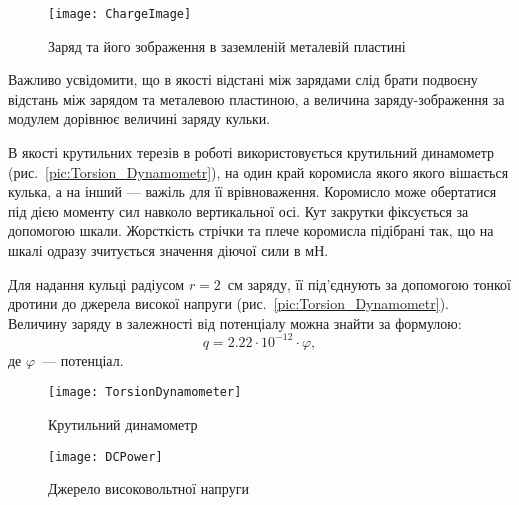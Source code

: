 \begin{wrapfigure}{O}{0.4\linewidth}\centering
		\texttt{[image: ChargeImage]}
		\caption{Заряд та його зображення в заземленій металевій пластині}
		\label{pic:Charge_Image}
\end{wrapfigure}
Важливо усвідомити, що в якості відстані між зарядами слід брати подвоєну відстань між зарядом та металевою пластиною, а величина заряду-зображення за модулем дорівнює величині заряду кульки.

В якості крутильних терезів в роботі використовується крутильний динамометр (рис.~\ref{pic:Torsion_Dynamometr}), на один край коромисла якого якого вішається кулька, а на інший --- важіль для її врівноваження. Коромисло може обертатися під дією моменту сил навколо вертикальної осі. Кут закрутки фіксується за допомогою шкали. Жорсткість стрічки та плече коромисла підібрані так, що на шкалі одразу зчитується значення діючої сили в мН.

Для надання кульці радіусом $r = 2$~см заряду, її під'єднують за допомогою тонкої дротини до джерела високої напруги (рис.~\ref{pic:Torsion_Dynamometr}). Величину заряду в залежності від потенціалу можна знайти за формулою:
\begin{equation}\label{qU}
    q = 2.22 \cdot 10^{-12} \cdot \varphi,
\end{equation}
де $\varphi$~--- потенціал.

\begin{figure}[htbp!]\centering
	\begin{minipage}[t]{0.47\linewidth}\centering
			\texttt{[image: TorsionDynamometer]}
			\caption{Крутильний динамометр}
			\label{pic:Torsion_Dynamometr}
	\end{minipage}
	\quad%
	\begin{minipage}[t]{0.47\linewidth}\centering
			\texttt{[image: DCPower]}
			\caption{Джерело високовольтної напруги}
			\label{pic:DCPower}
	\end{minipage}
\end{figure}




